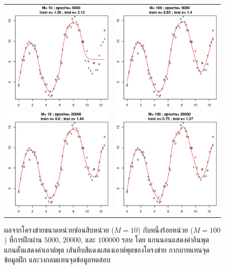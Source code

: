 \begin{figure}[htp]
  \centering
  \caption{ผลจากโครงข่ายขนาดหน่วยซ่อนสิบหน่วย ($M=10$) กับหนึ่งร้อยหน่วย ($M=100$) ที่การฝึกผ่าน
  $5000$, $20000$, และ $100000$ รอบ
  โดย แกนนอนแสดงค่าอินพุต แกนตั้งแสดงค่าเอาต์พุต
  เส้นทึบสีแดงแสดงเอาต์พุตของโครงข่าย
  กากบาทแทนจุดข้อมูลฝึก 
  และวงกลมแทนจุดข้อมูลทดสอบ}
  \label{fig: ANN simple example overfitting}

  \begin{tabular}{cc}
    \includegraphics[width=60mm]{04ANN/simpleM10E5000.eps}&    
    \includegraphics[width=60mm]{04ANN/simpleM100E5000.eps}     \\
    \includegraphics[width=60mm]{04ANN/simpleM10E20000.eps}    &    
    \includegraphics[width=60mm]{04ANN/simpleM100E20000.eps}     \\

\end{tabular}
\end{figure}
